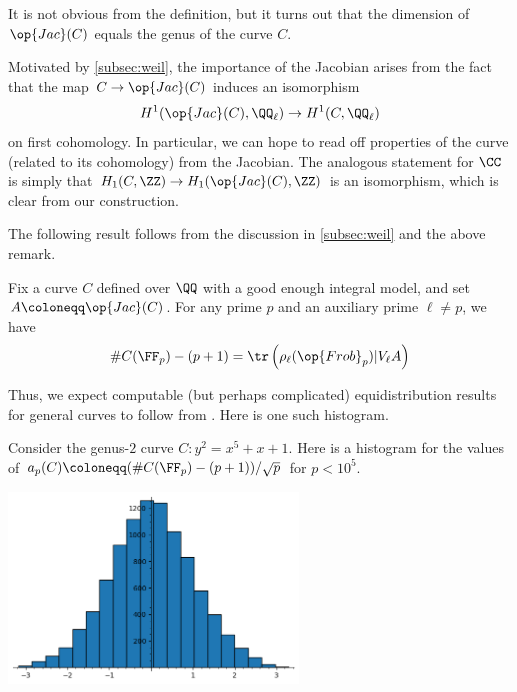 \documentclass{article}
\begin{document}
\begin{remark}
	It is not obvious from the definition, but it turns out that the dimension of $\op{Jac}(C)$ equals the genus of the curve $C$.
\end{remark}
\begin{remark}
	Motivated by \cref{subsec:weil}, the importance of the Jacobian arises from the fact that the map $C\to\op{Jac}(C)$ induces an isomorphism
	\[H^1(\op{Jac}(C),\QQ_\ell)\to H^1(C,\QQ_\ell)\]
	on first cohomology. In particular, we can hope to read off properties of the curve (related to its cohomology) from the Jacobian. The analogous statement for $\CC$ is simply that $H_1(C,\ZZ)\to H_1(\op{Jac}(C),\ZZ)$ is an isomorphism, which is clear from our construction.
\end{remark}
The following result follows from the discussion in \cref{subsec:weil} and the above remark.
\begin{proposition}
	Fix a curve $C$ defined over $\QQ$ with a good enough integral model, and set $A\coloneqq\op{Jac}(C)$. For any prime $p$ and an auxiliary prime $\ell\ne p$, we have
	\[\#C(\FF_p)-(p+1)=\tr\left(\rho_\ell({\op{Frob}_p})\vert V_\ell A\right)\]
\end{proposition}
Thus, we expect computable (but perhaps complicated) equidistribution results for general curves to follow from . Here is one such histogram.
\begin{example}
	Consider the genus-$2$ curve $C\colon y^2=x^5+x+1$. Here is a histogram for the values of $a_p(C)\coloneqq(\#C(\FF_p)-(p+1))/\sqrt p$ for $p<10^5$.
	\begin{center}
		\includegraphics[height=2in]{hyper.png}
	\end{center}
\end{example}
\end{document}

